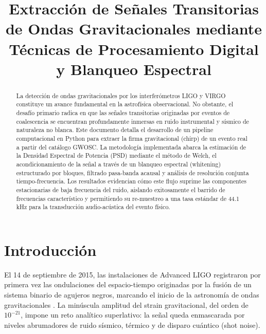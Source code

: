 \documentclass[conference]{IEEEtran}
\begin{document}
	
	\title{Extracción de Señales Transitorias de Ondas Gravitacionales mediante Técnicas de Procesamiento Digital y Blanqueo Espectral}
	
	\author{
		}
	
	\maketitle
	
	\begin{abstract}
		La detección de ondas gravitacionales por los interferómetros LIGO y VIRGO constituye un avance fundamental en la astrofísica observacional. No obstante, el desafío primario radica en que las señales transitorias originadas por eventos de coalescencia se encuentran profundamente inmersas en ruido instrumental y sísmico de naturaleza no blanca. Este documento detalla el desarrollo de un pipeline computacional en Python para extraer la firma gravitacional (chirp) de un evento real a partir del catálogo GWOSC. La metodología implementada abarca la estimación de la Densidad Espectral de Potencia (PSD) mediante el método de Welch, el acondicionamiento de la señal a través de un blanqueo espectral (whitening) estructurado por bloques, filtrado pasa-banda acausal y análisis de resolución conjunta tiempo-frecuencia. Los resultados evidencian cómo este flujo suprime las componentes estacionarias de baja frecuencia del ruido, aislando exitosamente el barrido de frecuencias característico y permitiendo su re-muestreo a una tasa estándar de 44.1 kHz para la transducción audio-acústica del evento físico.
	\end{abstract}
	
	\section{Introducción}
	El 14 de septiembre de 2015, las instalaciones de Advanced LIGO registraron por primera vez las ondulaciones del espacio-tiempo originadas por la fusión de un sistema binario de agujeros negros, marcando el inicio de la astronomía de ondas gravitacionales \cite{gw150914detectors}. La minúscula amplitud del strain gravitacional, del orden de $10^{-21}$, impone un reto analítico superlativo: la señal queda enmascarada por niveles abrumadores de ruido sísmico, térmico y de disparo cuántico (shot noise).
	
\end{document}
